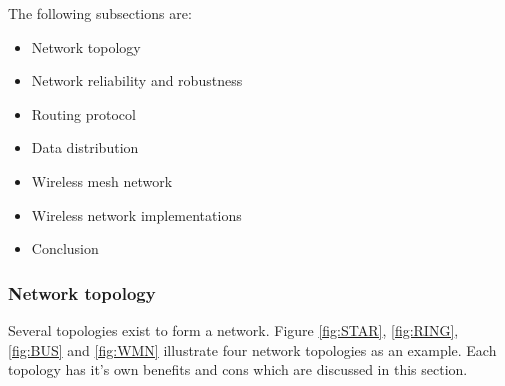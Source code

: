 \documentclass[10pt,a4paper]{article}
\begin{document}
The following subsections are:
\begin{itemize}
\setlength\itemsep{0em}
    \item Network topology
    \item Network reliability and robustness
    \item Routing protocol
    \item Data distribution
    \item Wireless mesh network
    \item Wireless network implementations
    \item Conclusion
\end{itemize}



\subsubsection{Network topology}
Several topologies exist to form a network. Figure \ref{fig:STAR}, \ref{fig:RING}, \ref{fig:BUS} and \ref{fig:WMN} illustrate four network topologies as an example. Each topology has it's own benefits and cons which are discussed in this section.
\end{document}
